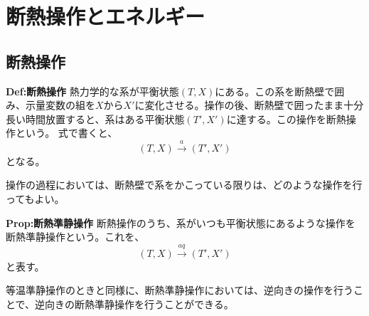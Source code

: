 \documentclass[a4paper,11pt]{jsarticle}
\begin{document}
\section{断熱操作とエネルギー}
\subsection{断熱操作}
\begin{itembox}[l]{\textbf{Def:断熱操作}}
    熱力学的な系が平衡状態$(T,X)$にある。この系を断熱壁で囲み、示量変数の組を$X$から$X'$に変化させる。操作の後、断熱壁で囲ったまま十分長い時間放置すると、系はある平衡状態$(T',X')$に達する。この操作を断熱操作という。
    式で書くと、
    \begin{equation}
        (T,X) \xrightarrow{a} (T',X')
    \end{equation}
    となる。
\end{itembox}
操作の過程においては、断熱壁で系をかこっている限りは、どのような操作を行ってもよい。\\

\begin{itembox}[l]{\textbf{Prop:断熱準静操作}}
    断熱操作のうち、系がいつも平衡状態にあるような操作を断熱準静操作という。これを、
    \begin{equation}
        (T,X) \xrightarrow{aq} (T',X')
    \end{equation}
    と表す。
\end{itembox}
等温準静操作のときと同様に、断熱準静操作においては、逆向きの操作を行うことで、逆向きの断熱準静操作を行うことができる。\\
\end{document}
